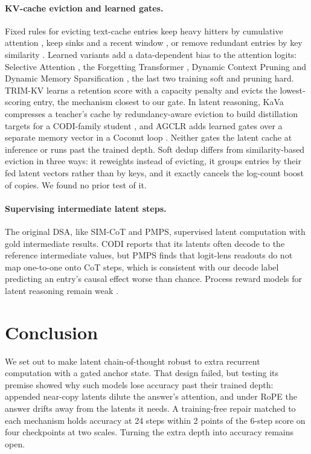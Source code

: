 \documentclass[11pt]{article}
\begin{document}
\paragraph{KV-cache eviction and learned gates.} Fixed rules for evicting text-cache entries keep heavy hitters by
cumulative attention \citep{zhang2023h2o}, keep sinks and a recent window \citep{xiao2024streamingllm}, or remove redundant
entries by key similarity \citep{cai2025rkv, park2025keydiff}. Learned variants add a data-dependent bias to the attention
logits: Selective Attention \citep{leviathan2025selective}, the Forgetting Transformer \citep{lin2025fox}, Dynamic Context
Pruning \citep{anagnostidis2023dcp} and Dynamic Memory Sparsification \citep{lancucki2025dms}, the last two training soft and
pruning hard. TRIM-KV \citep{trimkv2026} learns a retention score with a capacity penalty and evicts the lowest-scoring entry,
the mechanism closest to our gate. In latent reasoning, KaVa compresses a teacher's cache by redundancy-aware eviction to
build distillation targets for a CODI-family student \citep{kuzina2025kava}, and AGCLR adds learned gates over a separate
memory vector in a Coconut loop \citep{farhan2026agclr}. Neither gates the latent cache at inference or runs past the
trained depth. Soft dedup differs from similarity-based eviction in three ways: it reweights instead of evicting, it groups
entries by their fed latent vectors rather than by keys, and it exactly cancels the log-count boost of copies. We found no
prior test of it.

\paragraph{Supervising intermediate latent steps.} The original DSA, like SIM-CoT and PMPS, supervised latent computation
with gold intermediate results. CODI reports that its latents often decode to the reference intermediate values, but PMPS
finds that logit-lens readouts do not map one-to-one onto CoT steps, which is consistent with our decode label predicting an
entry's causal effect worse than chance. Process reward models for latent reasoning remain weak
\citep{wang2025inference}.

\section{Conclusion}

We set out to make latent chain-of-thought robust to extra recurrent computation with a gated anchor state. That design
failed, but testing its premise showed why such models lose accuracy past their trained depth: appended near-copy latents
dilute the answer's attention, and under RoPE the answer drifts away from the latents it needs. A training-free repair matched
to each mechanism holds accuracy at 24 steps within 2 points of the 6-step score on four checkpoints at two scales. Turning
the extra depth into accuracy remains open.
\end{document}
